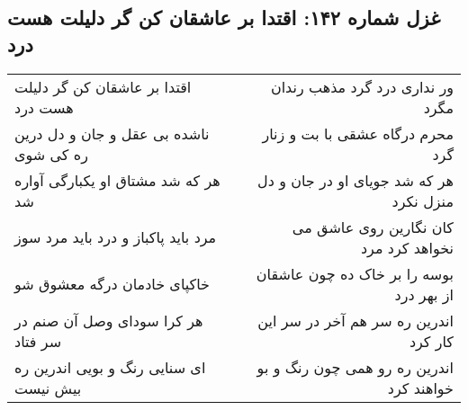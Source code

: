 \begin{center}
\section*{غزل شماره ۱۴۲: اقتدا بر عاشقان کن گر دلیلت هست درد}
\label{sec:142}
\begin{longtable}{l p{0.5cm} r}
اقتدا بر عاشقان کن گر دلیلت هست درد
&&
ور نداری درد گرد مذهب رندان مگرد
\\
ناشده بی عقل و جان و دل درین ره کی شوی
&&
محرم درگاه عشقی با بت و زنار گرد
\\
هر که شد مشتاق او یکبارگی آواره شد
&&
هر که شد جویای او در جان و دل منزل نکرد
\\
مرد باید پاکباز و درد باید مرد سوز
&&
کان نگارین روی عاشق می نخواهد کرد مرد
\\
خاکپای خادمان درگه معشوق شو
&&
بوسه را بر خاک ده چون عاشقان از بهر درد
\\
هر کرا سودای وصل آن صنم در سر فتاد
&&
اندرین ره سر هم آخر در سر این کار کرد
\\
ای سنایی رنگ و بویی اندرین ره بیش نیست
&&
اندرین ره رو همی چون رنگ و بو خواهند کرد
\\
\end{longtable}
\end{center}
